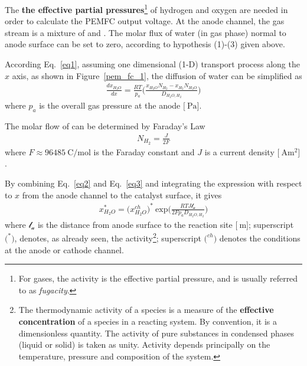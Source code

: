 \documentclass[12pt,a4paper]{scrartcl}
\begin{document}
\begin{onehalfspace}
The \textbf{the effective partial pressures}\footnote{For gases, the activity is the effective partial pressure, and is usually referred to as \textit{fugacity}.} of hydrogen and oxygen are needed in order to calculate the PEMFC output voltage. At the anode channel, the gas stream is a mixture of  and . The molar flux of water (in gas phase) normal to anode surface can be set to zero, according to hypothesis (1)-(3) given above.

According Eq.~\eqref{eq1}, assuming one dimensional (1-D) transport process along the $x$ axis, as shown in Figure~\ref{pem_fc_1}, the diffusion of water can be simplified as
\begin{equation}\label{eq2}
	\begin{aligned}
		\frac{dx_{H_2O}}{dx}=\frac{RT}{p_a}\Bigg(\frac{x_{H_2O}N_{H_2}-x_{H_2}N_{H_2O}}{D_{H_2O,H_2}}\Bigg)
	\end{aligned}
\end{equation}
where $p_a$ is the overall gas pressure at the anode $\Big[\SI{}{\pascal}\Big]$.

The molar flow of  can be determined by Faraday's Law
\begin{equation}\label{eq3}
	\begin{aligned}
		N_{H_2}=\frac{J}{2F}
	\end{aligned}
\end{equation}
where $F\approx\SI{96485}{\coulomb\per\mole}$ is the Faraday constant and $J$ is a current density $\Big[\SI{}{\ampere\square\meter}\Big]$.

By combining Eq.~\eqref{eq2} and Eq.~\eqref{eq3} and integrating the expression with respect to $x$ from the anode channel to the catalyst surface, it gives
\begin{equation}\label{eq4}
	\begin{aligned}
		x_{H_2O}^* = \Big(x_{H_2O}^{ch}\Big)^*\ \text{exp} \Big(\frac{RTJ\mathcal{l_a}}{2Fp_aD_{H_2O,H_2}}\Big)
	\end{aligned}
\end{equation}
where $\mathcal{l_a}$ is the distance from anode surface to the reaction site $\Big[\SI{}{\meter}\Big]$; superscript $\Big(^*\Big)$, denotes, as already seen, the activity\footnote{The thermodynamic activity of a species is a measure of the \textbf{effective concentration} of a species in a reacting system. By convention, it is a dimensionless quantity. The activity of pure substances in condensed phases (liquid or solid) is taken as unity. Activity depends principally on the temperature, pressure and composition of the system. 
}; superscript $\Big(^{ch}\Big)$ denotes the conditions at the anode or cathode channel.


\end{onehalfspace}
\end{document}
